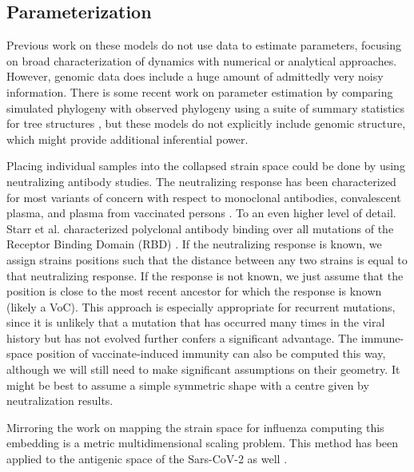 \documentclass{article}
\begin{document}
\subsection{Parameterization}

Previous work on these models do not use data to estimate parameters, focusing on broad characterization of dynamics with numerical or analytical approaches. However, genomic data does include a huge amount of admittedly very noisy information. There is some recent work on parameter estimation by comparing simulated phylogeny with observed phylogeny using a suite of summary statistics for tree structures \cite{danesh2021quantifying,leventhal2012inferring,saulnier2017inferring}, but these models do not explicitly include genomic structure, which might provide additional inferential power. 

Placing individual samples into the collapsed strain space could be done by using neutralizing antibody studies. The neutralizing response has been characterized for most variants of concern with respect to monoclonal antibodies, convalescent plasma, and plasma from vaccinated persons \cite{stanford2020}. To an even higher level of detail. Starr et al. characterized polyclonal antibody binding over all mutations of the Receptor Binding Domain (RBD) \cite{starr2020deep}. If the neutralizing response is known, we assign strains positions such that the distance between any two strains is equal to that neutralizing response. If the response is not known, we just assume that the position is close to the most recent ancestor for which the response is known (likely a VoC). This approach is especially appropriate for recurrent mutations, since it is unlikely that a mutation that has occurred many times in the viral history but has not evolved further confers a significant advantage. The immune-space position of vaccinate-induced immunity can also be computed this way, although we will still need to make significant assumptions on their geometry. It might be best to assume a simple symmetric shape with a centre given by neutralization results. 

Mirroring the work on mapping the strain space for influenza \cite{lapedesGeometryShapeSpace2001, smithMappingAntigenicGenetic2004, cai2010computational} computing this embedding is a metric multidimensional scaling problem. This method has been applied to the antigenic space of the Sars-CoV-2 as well \cite{millerAntigenicSpaceFramework2021, wilksMappingSARSCoV2Antigenic2022, van2022mapping}. 



\end{document}
